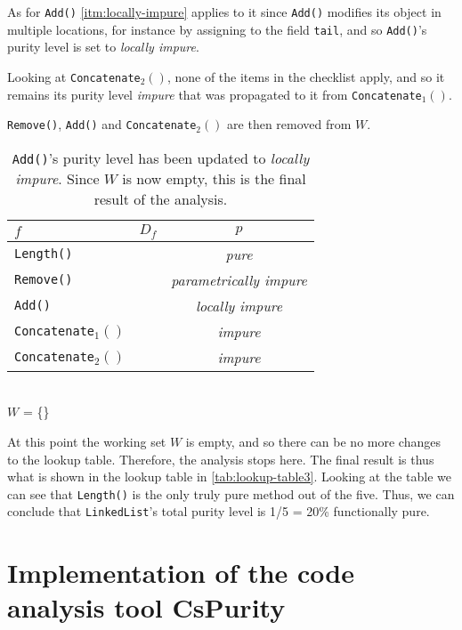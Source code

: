 \documentclass[a4paper,12pt]{article}
\begin{document}
As for \texttt{Add()} \autoref{itm:locally-impure} applies to it since \texttt{Add()} modifies its object in multiple locations, for instance by assigning to the field \texttt{tail}, and so \texttt{Add()}'s purity level is set to \textit{locally impure}.

Looking at \texttt{Concatenate$_2()$}, none of the items in the checklist apply, and so it remains its purity level \textit{impure} that was propagated to it from \texttt{Concatenate$_1()$}.

\texttt{Remove()}, \texttt{Add()} and \texttt{Concatenate$_2()$} are then removed from $W$.

\begin{table}[H]
  \caption{\texttt{Add()}'s purity level has been updated to \textit{locally impure}. Since $W$ is now empty, this is the final result of the analysis.}
  \label{tab:lookup-table3}
  \centering
  \begin{tabular}{|l|c|c|}
    \hline
    $f$                        & $D_f$                  & $p$                            \\ \hline
    \texttt{Length()}          &                        & \textit{pure}                         \\
    \texttt{Remove()}          &                        & \textit{parametrically impure}        \\
    \texttt{Add()}             &                        & \textit{locally impure}               \\
    \texttt{Concatenate$_1()$}  &                        & \textit{impure}                       \\
    \texttt{Concatenate$_2()$}  &                        & \textit{impure}                       \\ \hline
  \end{tabular}
  \\
  $W$ = \{\}
\end{table}

At this point the working set $W$ is empty, and so there can be no more changes to the lookup table. Therefore, the analysis stops here. The final result is thus what is shown in the lookup table in \autoref{tab:lookup-table3}. Looking at the table we can see that \texttt{Length()} is the only truly pure method out of the five. Thus, we can conclude that \texttt{LinkedList}'s total purity level is 1/5 = 20\% functionally pure.

\section{Implementation of the code analysis tool CsPurity} \label{sec:implementation-of-cspurity}
\end{document}
